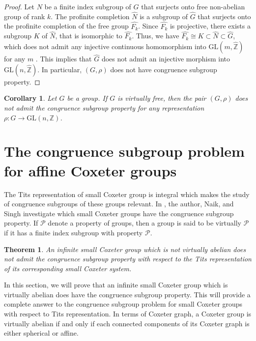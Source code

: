 \documentclass[12pt]{amsart}
\newtheorem{theorem}[equation]{Theorem}
\newtheorem{corollary}[equation]{Corollary}
\theoremstyle{definition}
\numberwithin{equation}{section}
\newcommand{\GL}{\mathrm{GL}}
\begin{document}
\begin{proof}
Let $N$ be a finite index subgroup of $G$ that surjects onto free non-abelian group of rank $k$. The profinite completion $\widehat{N}$ is a subgroup of $\widehat{G}$ that surjects onto the profinite completion of the free group $\widehat{F_k}$. Since $\widehat{F_k}$ is projective, there exists a subgroup $K$ of $\widehat{N}$, that is isomorphic to $\widehat{F_k}$. Thus, we have $\widehat{F_k}\cong K \subset \widehat{N} \subset \widehat{G}$, which does not admit any injective continuous homomorphism into $\GL(m, \hat{\mathbb Z})$ for any $m$ \cite[Proposition 3.8.3]{surybook}. This implies that $\widehat{G}$ does not admit an injective morphism into $\GL(n,\widehat{\mathbb Z})$. In particular, $(G,\rho)$ does not have congruence subgroup property. 
\end{proof}
\begin{corollary}
Let $G$ be a group. If $G$ is virtually free, then the pair $(G,\rho)$ does not admit the congruence subgroup property  for any representation $\rho:G \to \GL(n,\mathbb Z)$.
\end{corollary}
\medskip
\section{The congruence subgroup problem for affine Coxeter groups}\label{section 4}
The Tits representation of small Coxeter group is integral which makes the study of congruence subgroups of these groups relevant. In \cite{mypaper1}, the author, Naik, and Singh investigate which small Coxeter groups have the congruence subgroup property. If $\mathcal{P}$ denote a property of groups, then a group is said to be virtually $\mathcal{P}$ if it has a finite index subgroup with property $\mathcal{P}$. 

\begin{theorem}\cite[Theorem 3.8]{mypaper1}\label{p1:t3.8}
An infinite small Coxeter group which is not virtually abelian does not admit the congruence subgroup property with respect to the Tits representation of its corresponding small Coxeter system.
\end{theorem}

In this section, we will prove that an infinite small Coxeter group which is virtually abelian does have the congruence subgroup property. This will provide a complete answer to the congruence subgroup problem for small Coxeter groups with respect to Tits representation. In terms of Coxeter graph, a Coxeter group is virtually abelian if and only if each connected components of its Coxeter graph is either spherical or affine. 
\end{document}
